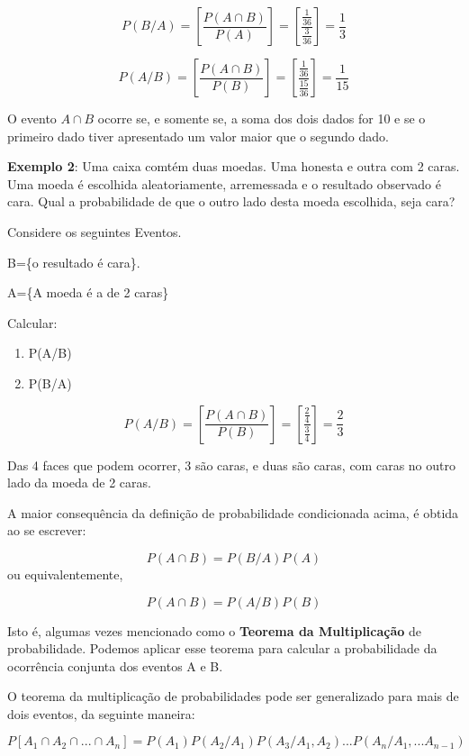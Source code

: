 $$P(B/A) = \left[ \frac{P(A \cap B)}{P(A)} \right] = \left[ \frac{\frac{1}{36}}{\frac{3}{36}} \right] = \frac{1}{3} $$


$$P(A/B) = \left[ \frac{P(A \cap B)}{P(B)} \right] =  \left[ \frac{\frac{1}{36}}{\frac{15}{36}} \right] = \frac{1}{15}$$

O evento $A \cap B$ ocorre se, e somente se, a soma dos dois dados
for 10 e se o primeiro dado tiver apresentado um valor maior que o
segundo dado.\vskip0.3cm


\textbf{Exemplo 2}: Uma caixa comtém duas moedas. Uma honesta e
outra com 2 caras. Uma moeda é escolhida aleatoriamente,
arremessada e o resultado observado é cara. Qual a probabilidade
de que o outro lado desta moeda escolhida, seja cara?\vskip0.3cm

Considere os seguintes Eventos.\vskip0.3cm

B=\{o resultado é cara\}.

A=\{A moeda é a de 2 caras\}

\vskip0.3cm

Calcular:

\begin{enumerate}
    \item P(A/B)
    \item P(B/A)
\end{enumerate}


$$P(A/B) = \left[ \frac{P(A \cap B)}{P(B)} \right] = \left[ \frac{\frac{2}{4}}{\frac{3}{4}} \right] = \frac{2}{3}$$

Das 4 faces que podem ocorrer, 3 são caras, e duas são caras, com
caras no outro lado da moeda de 2 caras.\vskip0.3cm


A maior consequência da definição de probabilidade condicionada
acima, é obtida ao se escrever:


$$
P(A \cap B)= P(B/A)P(A)
$$
 ou equivalentemente,

$$
P(A \cap B)= P(A/B)P(B)
$$

Isto é, algumas vezes mencionado como o \textbf{Teorema da
Multiplicação} de probabilidade. Podemos aplicar esse teorema para
calcular a probabilidade da ocorrência conjunta dos eventos A e B.
\vskip0.3cm

O teorema da multiplicação de probabilidades pode ser generalizado
para mais de dois eventos, da seguinte maneira:

\begin{equation}\label{}
    P[A_{1} \cap A_{2} \cap ... \cap A_{n}]=
    P(A_{1})P(A_{2}/A_{1})P(A_{3}/A_{1},A_{2})...P(A_{n}/A_{1},...A_{n-1})
\end{equation}

